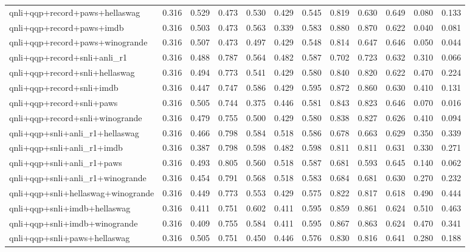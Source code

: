 \begin{table}[t]
\begin{tabular}{lrrrrrrrrrrr}
    qnli+qqp+record+paws+hellaswag & 0.316 & 0.529 & 0.473 & 0.530 & 0.429 & 0.545 & 0.819 & 0.630 & 0.649 & 0.080 & 0.133 \\
    qnli+qqp+record+paws+imdb & 0.316 & 0.503 & 0.473 & 0.563 & 0.339 & 0.583 & 0.880 & 0.870 & 0.622 & 0.040 & 0.081 \\
    qnli+qqp+record+paws+winogrande & 0.316 & 0.507 & 0.473 & 0.497 & 0.429 & 0.548 & 0.814 & 0.647 & 0.646 & 0.050 & 0.044 \\
    qnli+qqp+record+snli+anli\_r1 & 0.316 & 0.488 & 0.787 & 0.564 & 0.482 & 0.587 & 0.702 & 0.723 & 0.632 & 0.310 & 0.066 \\
    qnli+qqp+record+snli+hellaswag & 0.316 & 0.494 & 0.773 & 0.541 & 0.429 & 0.580 & 0.840 & 0.820 & 0.622 & 0.470 & 0.224 \\
    qnli+qqp+record+snli+imdb & 0.316 & 0.447 & 0.747 & 0.586 & 0.429 & 0.595 & 0.872 & 0.860 & 0.630 & 0.410 & 0.131 \\
    qnli+qqp+record+snli+paws & 0.316 & 0.505 & 0.744 & 0.375 & 0.446 & 0.581 & 0.843 & 0.823 & 0.646 & 0.070 & 0.016 \\
    qnli+qqp+record+snli+winogrande & 0.316 & 0.479 & 0.755 & 0.500 & 0.429 & 0.580 & 0.838 & 0.827 & 0.626 & 0.410 & 0.094 \\
    qnli+qqp+snli+anli\_r1+hellaswag & 0.316 & 0.466 & 0.798 & 0.584 & 0.518 & 0.586 & 0.678 & 0.663 & 0.629 & 0.350 & 0.339 \\
    qnli+qqp+snli+anli\_r1+imdb & 0.316 & 0.387 & 0.798 & 0.598 & 0.482 & 0.598 & 0.811 & 0.811 & 0.631 & 0.330 & 0.271 \\
    qnli+qqp+snli+anli\_r1+paws & 0.316 & 0.493 & 0.805 & 0.560 & 0.518 & 0.587 & 0.681 & 0.593 & 0.645 & 0.140 & 0.062 \\
    qnli+qqp+snli+anli\_r1+winogrande & 0.316 & 0.454 & 0.791 & 0.568 & 0.518 & 0.583 & 0.684 & 0.681 & 0.630 & 0.270 & 0.232 \\
    qnli+qqp+snli+hellaswag+winogrande & 0.316 & 0.449 & 0.773 & 0.553 & 0.429 & 0.575 & 0.822 & 0.817 & 0.618 & 0.490 & 0.444 \\
    qnli+qqp+snli+imdb+hellaswag & 0.316 & 0.411 & 0.751 & 0.602 & 0.411 & 0.595 & 0.859 & 0.861 & 0.624 & 0.510 & 0.463 \\
    qnli+qqp+snli+imdb+winogrande & 0.316 & 0.409 & 0.755 & 0.584 & 0.411 & 0.595 & 0.867 & 0.863 & 0.624 & 0.470 & 0.341 \\
    qnli+qqp+snli+paws+hellaswag & 0.316 & 0.505 & 0.751 & 0.450 & 0.446 & 0.576 & 0.830 & 0.816 & 0.641 & 0.280 & 0.188 \\

\end{tabular}
\end{table}
